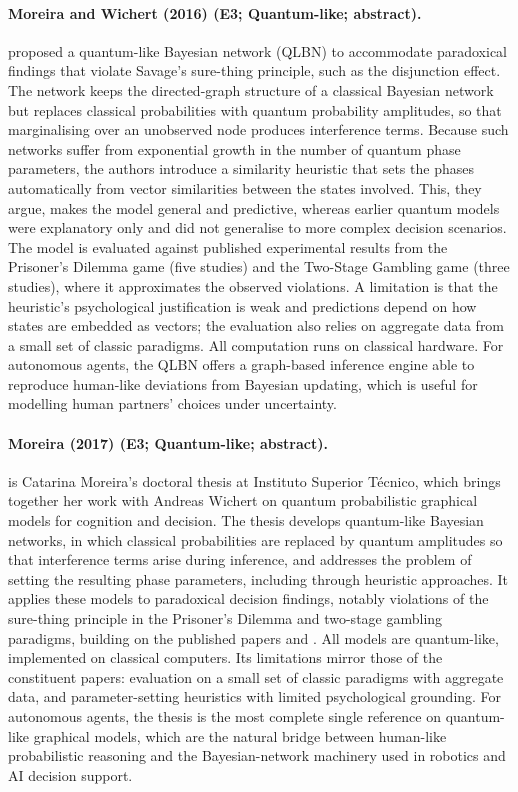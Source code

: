 \documentclass[10pt,a4paper]{article}
\begin{document}
\paragraph{Moreira and Wichert (2016) (E3; Quantum-like; abstract).} \citet{Moreira2016} proposed a quantum-like Bayesian network (QLBN) to accommodate paradoxical findings that violate Savage's sure-thing principle, such as the disjunction effect. The network keeps the directed-graph structure of a classical Bayesian network but replaces classical probabilities with quantum probability amplitudes, so that marginalising over an unobserved node produces interference terms. Because such networks suffer from exponential growth in the number of quantum phase parameters, the authors introduce a similarity heuristic that sets the phases automatically from vector similarities between the states involved. This, they argue, makes the model general and predictive, whereas earlier quantum models were explanatory only and did not generalise to more complex decision scenarios. The model is evaluated against published experimental results from the Prisoner's Dilemma game (five studies) and the Two-Stage Gambling game (three studies), where it approximates the observed violations. A limitation is that the heuristic's psychological justification is weak and predictions depend on how states are embedded as vectors; the evaluation also relies on aggregate data from a small set of classic paradigms. All computation runs on classical hardware. For autonomous agents, the QLBN offers a graph-based inference engine able to reproduce human-like deviations from Bayesian updating, which is useful for modelling human partners' choices under uncertainty.

\paragraph{Moreira (2017) (E3; Quantum-like; abstract).} \citet{Moreira2017a} is Catarina Moreira's doctoral thesis at Instituto Superior Técnico, which brings together her work with Andreas Wichert on quantum probabilistic graphical models for cognition and decision. The thesis develops quantum-like Bayesian networks, in which classical probabilities are replaced by quantum amplitudes so that interference terms arise during inference, and addresses the problem of setting the resulting phase parameters, including through heuristic approaches. It applies these models to paradoxical decision findings, notably violations of the sure-thing principle in the Prisoner's Dilemma and two-stage gambling paradigms, building on the published papers \citep{Moreira2014} and \citep{Moreira2016}. All models are quantum-like, implemented on classical computers. Its limitations mirror those of the constituent papers: evaluation on a small set of classic paradigms with aggregate data, and parameter-setting heuristics with limited psychological grounding. For autonomous agents, the thesis is the most complete single reference on quantum-like graphical models, which are the natural bridge between human-like probabilistic reasoning and the Bayesian-network machinery used in robotics and AI decision support.
\end{document}
